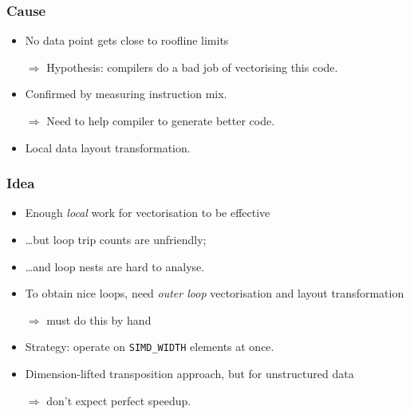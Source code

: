 \documentclass[presentation,aspectratio=43,10pt]{beamer}
\begin{document}
\begin{frame}
  \frametitle{Cause}
  \begin{itemize}
  \item No data point gets close to roofline limits
  \item[$\Rightarrow$] Hypothesis: compilers do a bad job of
    vectorising this code.
  \item Confirmed by measuring instruction mix.
    \begin{center}
    \end{center}
  \item[$\Rightarrow$] Need to help compiler to generate better code.
  \item Local data layout transformation.
  \end{itemize}
\end{frame}

\begin{frame}
  \frametitle{Idea}
  \begin{itemize}
  \item Enough \emph{local} work for vectorisation to be effective
  \item \dots but loop trip counts are unfriendly;
  \item \dots and loop nests are hard to analyse.
  \item To obtain nice loops, need \emph{outer loop} vectorisation and
    layout transformation
  \item[$\Rightarrow$] must do this by hand
  \item Strategy: operate on \texttt{SIMD\_WIDTH} elements at once.
  \item Dimension-lifted transposition approach, but for unstructured
    data
  \item[$\Rightarrow$] don't expect perfect speedup.
  \end{itemize}
\end{frame}
\end{document}
